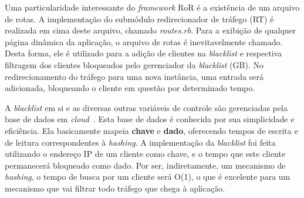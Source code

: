 Uma particularidade interessante do \emph{framework} RoR é a existência de um arquivo de rotas. A implementação do submódulo redirecionador de tráfego (RT) é realizada em cima deste arquivo, chamado \emph{routes.rb}. Para a exibição de qualquer página dinâmica da aplicação, o arquivo de rotas é inevitavelmente chamado. Desta forma, ele é utilizado para a adição de clientes na \emph{blacklist} e respectiva filtragem dos clientes bloqueados pelo gerenciador da \emph{blacklist} (GB). No redirecionamento do tráfego para uma nova instância, uma entrada será adicionada, bloqueando o cliente em questão por determinado tempo.


A \emph{blacklist} em si e as diversas outras variáveis de controle são gerenciadas pela base de dados em \emph{cloud}~\cite{redis}. Esta base de dados é conhecida por sua simplicidade e eficiência. Ela basicamente mapeia \textbf{chave} e \textbf{dado}, oferecendo tempos de escrita e de leitura correspondentes à \emph{hashing}. A implementação da \emph{blacklist} foi feita utilizando o endereço IP de um cliente como chave, e o tempo que este cliente permanecerá bloqueado como dado. Por ser, indiretamente, um mecanismo de \emph{hashing}, o tempo de busca por um cliente será O(1), o que é excelente para um mecanismo que vai filtrar todo tráfego que chega à aplicação. %

